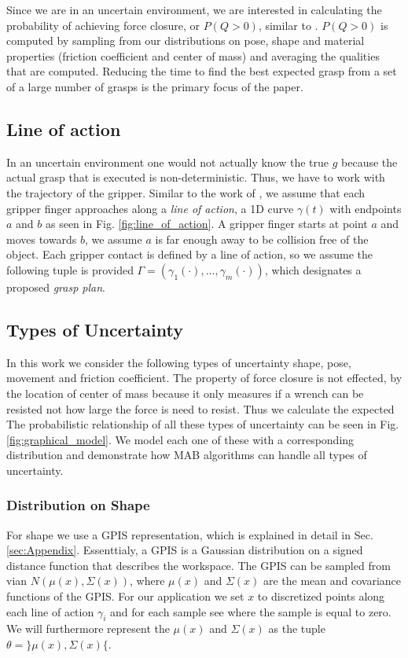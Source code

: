 \documentclass[letterpaper, 10 pt, conference]{ieeeconf}  %
\begin{document}
Since we are in an uncertain environment, we are interested in calculating the probability of achieving force closure, or $P(Q>0)$, similar to  \cite{christopoulos2007handling}\cite{kehoe2012toward} . $P(Q>0)$ is computed by sampling from our distributions on pose, shape and material properties (friction coefficient and center of mass) and averaging the qualities that are computed. Reducing the time to find the best expected grasp from a set of a large number of grasps is the primary focus of the paper. 

\subsection{Line of action}
In an uncertain environment one would not actually know the true $g$ because the actual grasp that is executed is non-deterministic. Thus, we have to work with the trajectory of the gripper. Similar to the work of \cite{christopoulos2007handling}, we assume that each gripper finger approaches along a \textit{line of action}, a 1D curve $\gamma(t)$ with endpoints $a$ and $b$ as seen in Fig. \ref{fig:line_of_action}.
A gripper finger starts at point $a$ and moves towards $b$, we assume $a$ is far enough away to be collision free of the object.
Each gripper contact is defined by a line of action, so we assume the following tuple is provided $\Gamma = ( \gamma_1(\cdot),...,\gamma_m(\cdot) )$, which designates a proposed \textit{grasp plan}.

\subsection{Types of Uncertainty}
In this work we consider the following types of uncertainty shape, pose, movement  and friction coefficient.  The property of force closure is not effected, by the location of center of mass because it only measures if a wrench can be resisted not how large the force is need to resist. Thus we calculate the expected The probabilistic relationship of all these types of uncertainty can be seen in Fig. \ref{fig:graphical_model}. We model each one of these with a corresponding distribution and demonstrate how MAB algorithms can handle all types of uncertainty.

\subsubsection{Distribution on Shape}

For shape we use a GPIS representation, which is explained in detail in Sec. \ref{sec:Appendix}. Essenttialy, a GPIS is a Gaussian distribution on a signed distance function that describes the workspace. The GPIS can be sampled from vian $N(\mu(x),\Sigma(x))$, where $\mu(x)$ and $\Sigma(x)$ are the mean and covariance functions of the GPIS. For our application we set $x$ to discretized points along each line of action $\gamma_i$ and for each sample see where the sample is equal to zero.  We will furthermore represent the $\mu(x)$ and $\Sigma(x)$ as the tuple $\theta = \rbrace\mu(x), \Sigma(x)\lbrace$. 
\end{document}
